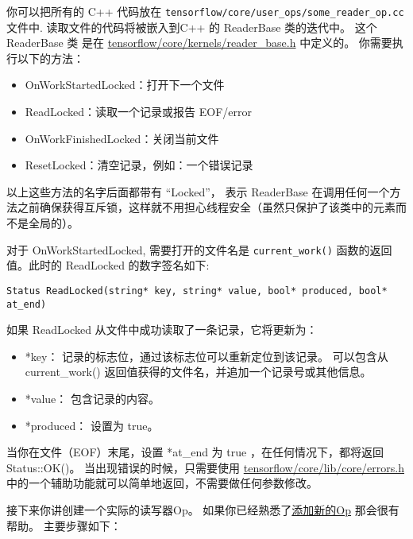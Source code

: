 你可以把所有的 C++ 代码放在
\texttt{tensorflow/core/user\_ops/some\_reader\_op.cc}文件中.
读取文件的代码将被嵌入到C++ 的 ReaderBase 类的迭代中。 这个 ReaderBase
类 是在
\href{https://tensorflow.googlesource.com/tensorflow/+/master/tensorflow/core/kernels/reader_base.h}{tensorflow/core/kernels/reader\_base.h}
中定义的。 你需要执行以下的方法：

\begin{itemize}
\tightlist
\item
  OnWorkStartedLocked：打开下一个文件
\item
  ReadLocked：读取一个记录或报告 EOF/error
\item
  OnWorkFinishedLocked：关闭当前文件
\item
  ResetLocked：清空记录，例如：一个错误记录
\end{itemize}

以上这些方法的名字后面都带有 ``Locked''， 表示 ReaderBase
在调用任何一个方法之前确保获得互斥锁，这样就不用担心线程安全（虽然只保护了该类中的元素而不是全局的）。

对于 OnWorkStartedLocked, 需要打开的文件名是 \texttt{current\_work()}
函数的返回值。此时的 ReadLocked 的数字签名如下:

\begin{verbatim}
Status ReadLocked(string* key, string* value, bool* produced, bool* at_end)
\end{verbatim}

如果 ReadLocked 从文件中成功读取了一条记录，它将更新为：

\begin{itemize}
\tightlist
\item
  *key： 记录的标志位，通过该标志位可以重新定位到该记录。 可以包含从
  current\_work() 返回值获得的文件名，并追加一个记录号或其他信息。
\item
  *value： 包含记录的内容。
\item
  *produced： 设置为 true。
\end{itemize}

当你在文件（EOF）末尾，设置 *at\_end 为 true ，在任何情况下，都将返回
Status::OK()。 当出现错误的时候，只需要使用
\href{https://tensorflow.googlesource.com/tensorflow/+/master/tensorflow/core/lib/core/errors.h}{tensorflow/core/lib/core/errors.h}
中的一个辅助功能就可以简单地返回，不需要做任何参数修改。

接下来你讲创建一个实际的读写器Op。
如果你已经熟悉了\href{tensorflow-zh/SOURCE/how_tos/adding_an_op/index.md}{添加新的Op}
那会很有帮助。 主要步骤如下：

